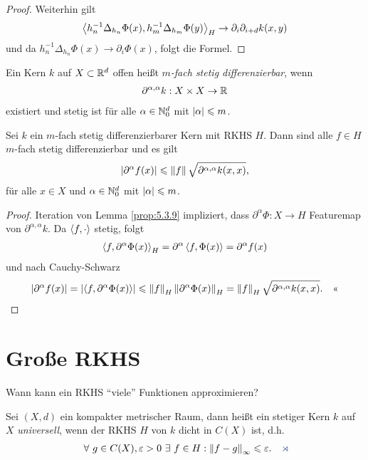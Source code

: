 \begin{proof}
Weiterhin gilt
\begin{align*}
\left\langle h_n^{-1}\Delta_{h_n}\Phi(x),h_m^{-1}\Delta_{h_m} \Phi(y)\right\rangle_H\to \partial_i
\partial_{i+d} k(x,y)
\end{align*} 
und da $h_n^{-1}\Delta_{h_n}\Phi(x) \to \partial_i \Phi(x)$, folgt die
Formel.\qedhere
\end{proof}

\begin{defn}
\label{defn:5.3.10}
Ein Kern $k$ auf $X\subset\mathbb{R}^d$ offen heißt \emph{$m$-fach stetig
differenzierbar}, wenn
\begin{align*}
\partial^{\alpha,\alpha} k : X\times X\to \mathbb{R}
\end{align*}
existiert und stetig ist für alle $\alpha\in\mathbb{N}_0^d$ mit $\left|\alpha\right|\leqslant
m$.\fishhere
\end{defn}

\begin{cor}
\label{prop:5.3.11}
Sei $k$ ein $m$-fach stetig differenzierbarer Kern mit RKHS $H$. Dann sind alle
$f\in H$ $m$-fach stetig differenzierbar und es gilt
\begin{align*}
\left|\partial^\alpha f(x)\right| \leqslant \left\|f\right\|\sqrt{\partial^{\alpha,\alpha}k(x,x)},
\end{align*}
für alle $x\in X$ und $\alpha\in \mathbb{N}_0^d$ mit $\left|\alpha\right|\leqslant m$.\fishhere
\end{cor}
\begin{proof}
Iteration von Lemma \ref{prop:5.3.9} impliziert, dass $\partial^\alpha \Phi: X
\to H$ Featuremap von $\partial^{\alpha,\alpha} k$. Da $\left\langle f,\cdot\right\rangle$ stetig,
folgt
\begin{align*}
\left\langle f,\partial^\alpha \Phi(x)\right\rangle_H = \partial^\alpha \left\langle f,\Phi(x)\right\rangle =
\partial^\alpha f(x)
\end{align*}
und nach Cauchy-Schwarz
\begin{align*}
\left|\partial^\alpha f(x)\right| = \left|\left\langle f,\partial^\alpha \Phi(x)\right\rangle\right| \leqslant
\left\|f\right\|_H \left\|\partial^\alpha \Phi(x)\right\|_H
= \left\|f\right\|_H \sqrt{\partial^{\alpha,\alpha}k(x,x)}.\quad\text{<<}
\end{align*}
\end{proof}

\section{Große RKHS}

Wann kann ein RKHS "`viele"' Funktionen approximieren?

\begin{defn}
\label{defn:5.4.1}
Sei $(X,d)$ ein kompakter metrischer Raum, dann heißt ein stetiger Kern $k$ auf
$X$ \emph{universell}, wenn der RKHS $H$ von $k$ dicht in
$C(X)$ ist, d.h.
\begin{align*}
\forall g\in C(X), \ep > 0 \exists f\in H : \norm{f-g}_\infty \le \ep.\fishhere
\end{align*}
\end{defn}

